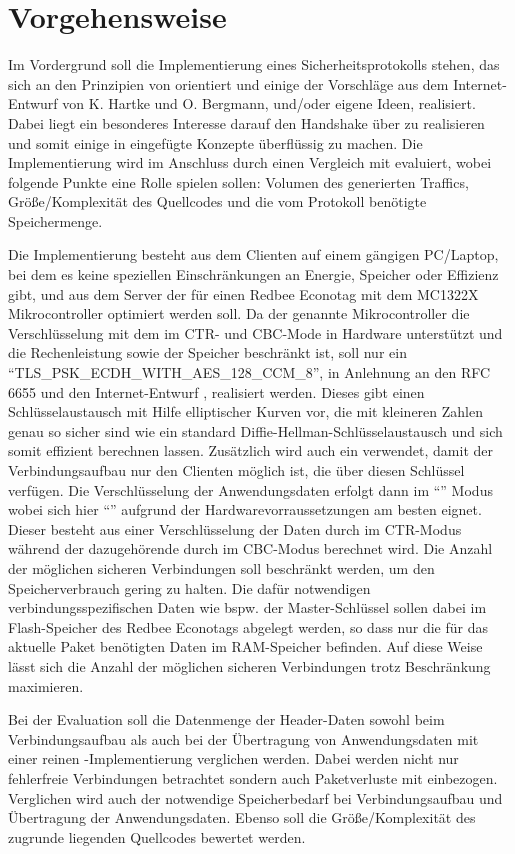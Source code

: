 \chapter{Vorgehensweise}

Im Vordergrund soll die Implementierung eines Sicherheitsprotokolls stehen, das sich an den Prinzipien von  orientiert
und einige der Vorschläge aus dem Internet-Entwurf von K. Hartke und O. Bergmann, und/oder eigene Ideen, realisiert.
Dabei liegt ein besonderes Interesse darauf den Handshake über  zu realisieren und somit einige in  eingefügte Konzepte überflüssig zu machen.
Die Implementierung wird im Anschluss durch einen Vergleich mit  evaluiert, wobei folgende Punkte eine Rolle spielen sollen:
Volumen des generierten Traffics, Größe/Komplexität des Quellcodes und die vom Protokoll benötigte Speichermenge.

Die Implementierung besteht aus dem Clienten auf einem gängigen PC/Laptop, bei dem es keine speziellen Einschränkungen an Energie,
Speicher oder Effizienz gibt, und aus dem Server der für einen Redbee Econotag \cite{econotag} mit dem MC1322X
Mikrocontroller \cite{mc1322x} optimiert werden soll. Da der genannte Mikrocontroller die Verschlüsselung mit dem  im CTR- und CBC-Mode
in Hardware unterstützt und die Rechenleistung sowie der Speicher beschränkt ist, soll nur ein  "`TLS\_PSK\_ECDH\_WITH\_AES\_128\_CCM\_8"',
in Anlehnung an den RFC 6655 \cite{rfc6655} und den Internet-Entwurf \cite{draftaesecc}, realisiert werden. Dieses gibt einen Schlüsselaustausch mit
Hilfe elliptischer Kurven vor, die mit kleineren Zahlen genau so sicher sind wie ein standard Diffie-Hellman-Schlüsselaustausch und sich somit
effizient berechnen lassen. Zusätzlich wird auch ein  verwendet, damit der Verbindungsaufbau nur den Clienten möglich ist, die über diesen
Schlüssel verfügen. Die Verschlüsselung der Anwendungsdaten erfolgt dann im "`"' Modus \cite{rfc5116}
wobei sich hier "`"' \cite{rfc3610} aufgrund der Hardwarevorraussetzungen am besten eignet. Dieser besteht
aus einer Verschlüsselung der Daten durch  im CTR-Modus während der dazugehörende  durch  im CBC-Modus berechnet wird.
Die Anzahl der möglichen sicheren Verbindungen soll beschränkt werden, um den Speicherverbrauch gering zu halten.
Die dafür notwendigen verbindungsspezifischen Daten wie bspw. der Master-Schlüssel sollen dabei im Flash-Speicher des Redbee Econotags
abgelegt werden, so dass nur die für das aktuelle Paket benötigten Daten im RAM-Speicher befinden. Auf diese Weise lässt sich
die Anzahl der möglichen sicheren Verbindungen trotz Beschränkung maximieren.

Bei der Evaluation soll die Datenmenge der Header-Daten sowohl beim Verbindungsaufbau als auch bei der Übertragung von Anwendungsdaten
mit einer reinen -Implementierung verglichen werden. Dabei werden nicht nur fehlerfreie Verbindungen betrachtet sondern auch Paketverluste
mit einbezogen. Verglichen wird auch der notwendige Speicherbedarf bei Verbindungsaufbau und Übertragung der Anwendungsdaten.
Ebenso soll die Größe/Komplexität des zugrunde liegenden Quellcodes bewertet werden.